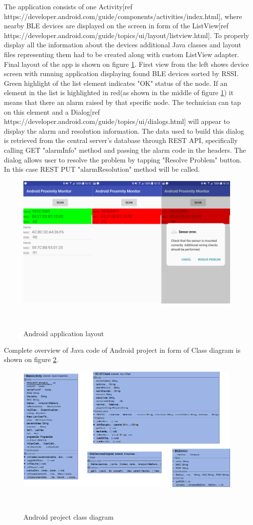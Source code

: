The application consists of one Activity[ref https://developer.android.com/guide/components/activities/index.html], where nearby BLE devices are displayed on the screen in form of the ListView[ref https://developer.android.com/guide/topics/ui/layout/listview.html]. To properly display all the information about the devices additional Java classes and layout files representing them had to be created along with custom ListView adapter. Final layout of the app is shown on figure \ref{fig:AndroidScreenshots}. First view from the left shows device screen with running application displaying found BLE devices sorted by RSSI. Green highlight of the list element indicates "OK" status of the node. If an element in the list is highlighted in red(as shown in the middle of figure \ref{fig:AndroidScreenshots}) it means that there an alarm raised by that specific node. The technician can tap on this element and a Dialog[ref https://developer.android.com/guide/topics/ui/dialogs.html] will appear to display the alarm and resolution information. The data used to build this dialog is retrieved from the central server's database through REST API, specifically calling GET "alarmInfo" method and passing the alarm code in the headers. The dialog allows user to resolve the problem by tapping "Resolve Problem" button. In this case REST PUT "alarmResolution" method will be called.

\begin{figure}[H]
\centering
\includegraphics[scale=0.65]{gfx/AndroidScreenshots}
\caption{Android application layout}~\label{fig:AndroidScreenshots}
\end{figure}

Complete overview of Java code of Android project in form of Class diagram is shown on figure \ref{fig:AndroidClass}. 

\begin{figure}[H]
\centering
\includegraphics[scale=0.45]{gfx/AndroidClassDiagram}
\caption{Android project class diagram}~\label{fig:AndroidClass}
\end{figure}
